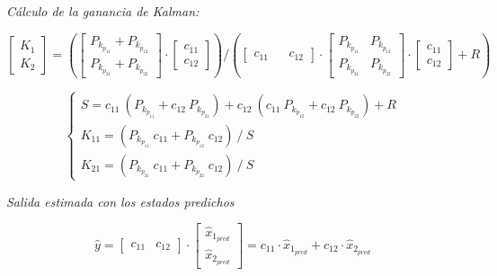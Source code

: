 \textit{Cálculo de la ganancia de Kalman:}

\vspace{-0.5cm}
\begin{equation}
    \begin{bmatrix}
        K_{1} \\
        K_{2}
    \end{bmatrix}
    =
    \left(
    \begin{bmatrix}
        P_{k_{p_{11}}} + P_{k_{p_{12}}} \\
        P_{k_{p_{21}}} + P_{k_{p_{22}}}
    \end{bmatrix}
    \cdot
    \begin{bmatrix}
        c_{11} \\
        c_{12}
    \end{bmatrix}
    \right)
    \bigg/
    \left(
    \begin{bmatrix}
        c_{11} && c_{12}
    \end{bmatrix}
    \cdot
    \begin{bmatrix}
        P_{k_{p_{11}}} & P_{k_{p_{12}}} \\
        P_{k_{p_{21}}} & P_{k_{p_{22}}}
    \end{bmatrix}
    \cdot
    \begin{bmatrix}
        c_{11} \\
        c_{12}
    \end{bmatrix}
    +
    R
    \right)
\end{equation}
\vspace{-0.5cm}

\vspace{-0.5cm}
\begin{equation}
    \begin{cases}
        S = c_{11}\ (P_{k_{p_{11}}} + c_{12}\ P_{k_{p_{21}}}) + c_{12}\ (c_{11}\ P_{k_{p_{12}}} + c_{12}\ P_{k_{p_{22}}}) + R
        \\
        K_{11} = (P_{k_{p_{11}}}\ c_{11} + P_{k_{p_{12}}}\ c_{12})\ /\ S 
        \\
        K_{21} = (P_{k_{p_{21}}}\ c_{11} + P_{k_{p_{22}}}\ c_{12})\ /\ S
    \end{cases}
\end{equation}
\vspace{-0.5cm}

\textit{Salida estimada con los estados predichos}

\vspace{-0.5cm}
\begin{equation}
    \hat{y} =
    \begin{bmatrix}
        c_{11} & c_{12}
    \end{bmatrix}
    \cdot
    \begin{bmatrix}
        \hat{x}_{1_{pred}} \\
        \hat{x}_{2_{pred}}
    \end{bmatrix}
    =
    c_{11} \cdot \hat{x}_{1_{pred}} + c_{12} \cdot \hat{x}_{2_{pred}}
\end{equation}
\vspace{-0.5cm}

